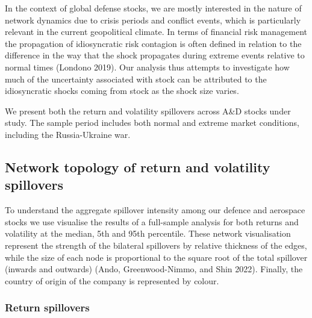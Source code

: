 \documentclass[
  letterpaper,
  DIV=11,
  numbers=noendperiod]{scrartcl}
\begin{document}
In the context of global defense stocks, we are mostly interested in the
nature of network dynamics due to crisis periods and conflict events,
which is particularly relevant in the current geopolitical climate. In
terms of financial risk management the propagation of idiosyncratic risk
contagion is often defined in relation to the difference in the way that
the shock propagates during extreme events relative to normal times
(Londono 2019). Our analysis thus attempts to investigate how much of
the uncertainty associated with stock can be attributed to the
idiosyncratic shocks coming from stock as the shock size varies.

We present both the return and volatility spillovers across A\&D stocks
under study. The sample period includes both normal and extreme market
conditions, including the Russia-Ukraine war.

\hypertarget{network-topology-of-return-and-volatility-spillovers}{%
\subsection{Network topology of return and volatility
spillovers}\label{network-topology-of-return-and-volatility-spillovers}}

To understand the aggregate spillover intensity among our defence and
aerospace stocks we use visualise the results of a full-sample analysis
for both returns and volatility at the median, 5th and 95th percentile.
These network visualisation represent the strength of the bilateral
spillovers by relative thickness of the edges, while the size of each
node is proportional to the square root of the total spillover (inwards
and outwards) (Ando, Greenwood-Nimmo, and Shin 2022). Finally, the
country of origin of the company is represented by colour.

\hypertarget{return-spillovers}{%
\subsubsection{Return spillovers}\label{return-spillovers}}
\end{document}
